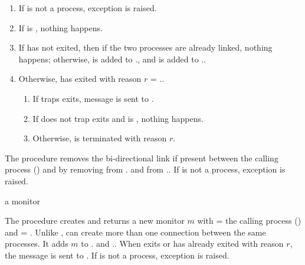 \begin{enumerate}
\item If  is not a process, exception  is raised.
\item If  is , nothing happens.
\item If  has not exited, then if the two processes are
  already linked, nothing happens; otherwise,  is added to
  ., and  is added to
  ..
\item Otherwise,  has exited with reason $r$ =
  ..
  \begin{enumerate}
  \item If  traps exits, message 
    is sent to .
  \item If  does not trap exits and  is ,
    nothing happens.
  \item Otherwise,  is terminated with reason $r$.
  \end{enumerate}
\end{enumerate}

\begin{procedure}
\end{procedure}
\returns{} 

The  procedure removes the bi-directional link if
present between the calling process () and  by
removing  from . and
 from ..  If  is not
a process, exception  is
raised.

\begin{procedure}
\end{procedure}
\returns{} a monitor

The  procedure creates and returns a new monitor $m$
with  = the calling process () and
 = .  Unlike ,
 can create more than one connection between the same
processes.  It adds $m$ to . and
..  When  exits or has
already exited with reason $r$, the message  is sent to .  If  is not
a process, exception  is
raised.


